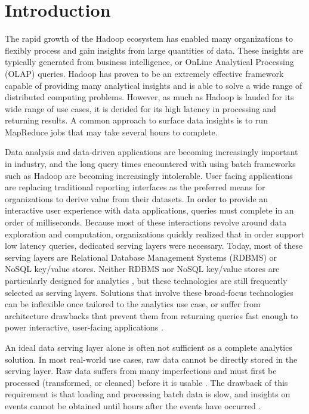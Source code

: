 \documentclass{vldb}
\begin{document}
\section{Introduction}
The rapid growth of the Hadoop\cite{shvachko2010hadoop} ecosystem has enabled
many organizations to flexibly process and gain insights from large quantities
of data. These insights are typically generated from business intelligence, or
OnLine Analytical Processing (OLAP) queries. Hadoop has proven to be an
extremely effective framework capable of providing many analytical insights and
is able to solve a wide range of distributed computing problems. However, as
much as Hadoop is lauded for its wide range of use cases, it is derided for its
high latency in processing and returning results. A common approach to surface
data insights is to run MapReduce jobs that may take several hours to complete.

Data analysis and data-driven applications are becoming increasingly important
in industry, and the long query times encountered with using batch frameworks
such as Hadoop are becoming increasingly intolerable. User facing applications
are replacing traditional reporting interfaces as the preferred means for
organizations to derive value from their datasets. In order to provide an
interactive user experience with data applications, queries must complete in an
order of milliseconds. Because most of these interactions revolve around data
exploration and computation, organizations quickly realized that in order
support low latency queries, dedicated serving layers were necessary. Today,
most of these serving layers are Relational Database Management Systems (RDBMS)
or NoSQL key/value stores. Neither RDBMS nor NoSQL key/value stores are
particularly designed for analytics \cite{stonebraker2009requirements}, but
these technologies are still frequently selected as serving layers. Solutions
that involve these broad-focus technologies can be inflexible once tailored to
the analytics use case, or suffer from architecture drawbacks that prevent them
from returning queries fast enough to power interactive, user-facing
applications \cite{tschetter2011druid}.

An ideal data serving layer alone is often not sufficient as a complete analytics
solution. In most real-world use cases, raw data cannot be directly stored in
the serving layer. Raw data suffers from many imperfections and must first be
processed (transformed, or cleaned) before it is usable
\cite{stonebraker2010mapreduce}. The drawback of this requirement is that
loading and processing batch data is slow, and insights on events cannot be
obtained until hours after the events have occurred \cite{yang2014radstack}.
\end{document}

